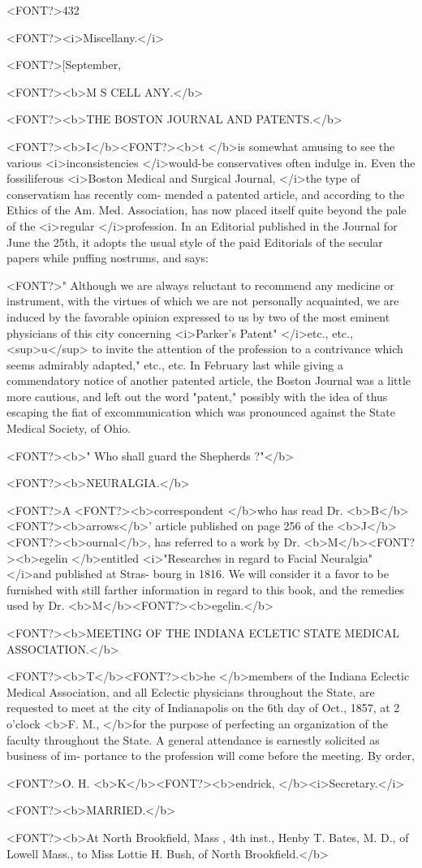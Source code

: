 <FONT?>432

<FONT?><i>Miscellany.</i>

<FONT?>[September,

<FONT?><b>M S CELL ANY.</b>

<FONT?><b>THE BOSTON JOURNAL AND PATENTS.</b>

<FONT?><b>I</b><FONT?><b>t </b>is somewhat amusing to see the various <i>inconsistencies </i>would-be
conservatives often indulge in. Even the fossiliferous <i>Boston Medical
and Surgical Journal, </i>the type of conservatism has recently com-
mended a patented article, and according to the Ethics of the Am.
Med. Association, has now placed itself quite beyond the pale of the
<i>regular </i>profession. In an Editorial published in the Journal for June
the 25th, it adopts the usual style of the paid Editorials of the secular
papers while puffing nostrums, and says:

<FONT?>" Although we are always reluctant to recommend any medicine or
instrument, with the virtues of which we are not personally acquainted,
we are induced by the favorable opinion expressed to us by two of
the most eminent physicians of this city concerning <i>Parker's Patent"
</i>etc., etc., <sup>u</sup> to invite the attention of the profession to a contrivance
which seems admirably adapted," etc., etc. In February last while
giving a commendatory notice of another patented article, the Boston
Journal was a little more cautious, and left out the word "patent,"
possibly with the idea of thus escaping the fiat of excommunication
which was pronounced against the State Medical Society, of Ohio.

<FONT?><b>" Who shall guard the Shepherds ?"</b>

<FONT?><b>NEURALGIA.</b>

<FONT?>A <FONT?><b>correspondent </b>who has read Dr. <b>B</b><FONT?><b>arrows</b>' article published on
page 256 of the <b>J</b><FONT?><b>ournal</b>, has referred to a work by Dr. <b>M</b><FONT?><b>egelin </b>entitled
<i>"Researches in regard to Facial Neuralgia" </i>and published at Stras-
bourg in 1816. We will consider it a favor to be furnished with still
farther information in regard to this book, and the remedies used by Dr.
<b>M</b><FONT?><b>egelin.</b>

<FONT?><b>MEETING OF THE INDIANA ECLETIC STATE MEDICAL ASSOCIATION.</b>

<FONT?><b>T</b><FONT?><b>he </b>members of the Indiana Eclectic Medical Association, and all
Eclectic physicians throughout the State, are requested to meet at the
city of Indianapolis on the 6th day of Oct., 1857, at 2 o'clock <b>F. M.,
</b>for the purpose of perfecting an organization of the faculty throughout
the State. A general attendance is earnestly solicited as business of im-
portance to the profession will come before the meeting.   By order,

<FONT?>O. H. <b>K</b><FONT?><b>endrick, </b><i>Secretary.</i>

<FONT?><b>MARRIED.</b>

<FONT?><b>At North Brookfield, Mass , 4th inst., Henby T. Bates, M. D., of Lowell Mass., to Miss
Lottie H. Bush, of North Brookfield.</b>\endinput
